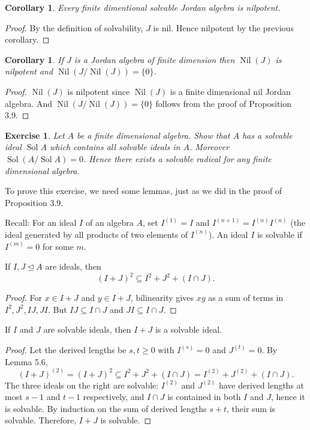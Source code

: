 \documentclass{article}
\newtheorem{corollary}[theorem]{Corollary}
\newtheorem{exercise}[theorem]{Exercise}
\begin{document}
\begin{corollary}
Every finite dimentional solvable Jordan algebra is nilpotent.
\end{corollary}

\begin{proof} 
By the definition of solvability, $ J $ is nil. Hence nilpotent by the previous corollary.
\end{proof}

\begin{corollary}  
If $J$ is a Jordan algebra of finite dimension then $\operatorname{Nil}(J)$ is nilpotent and $\operatorname{Nil}(J/\operatorname{Nil}(J)) = \{0\}$.  
\end{corollary}  

\begin{proof} 
$ \operatorname{Nil}(J) $ is nilpotent since $ \operatorname{Nil}(J) $ is a finite dimensional nil Jordan algebra. And $\operatorname{Nil}(J/\operatorname{Nil}(J)) = \{0\}$ follows from the proof of Proposition 3.9. 
\end{proof}

\begin{exercise}  
Let $A$ be a finite dimensional algebra. Show that $A$ has a solvable ideal $\operatorname{Sol} A$ which contains all solvable ideals in $ A $. Moreover $ \operatorname{Sol}(A/\operatorname{Sol} A)=0 $. Hence there exists a solvable radical for any finite dimensional algebra.  
\end{exercise} 

To prove this exercise, we need some lemmas, just as we did in the proof of Proposition 3.9.

Recall: For an ideal $I$ of an algebra $A$, set $I^{(1)} = I$ and $I^{(n+1)} = I^{(n)} I^{(n)}$ (the ideal generated by all products of two elements of $I^{(n)}$). An ideal $I$ is solvable if $I^{(m)} = 0$ for some $m$.  

\begin{lemma}  
If $I, J \trianglelefteq A$ are ideals, then  
\[ (I+J)^2 \subseteq I^2 + J^2 + (I \cap J). \]  
\end{lemma}  
\begin{proof}  
For $x \in I+J$ and $y \in I+J$, bilinearity gives $xy$ as a sum of terms in $I^2, J^2, IJ, JI$. But $IJ \subseteq I \cap J$ and $JI \subseteq I \cap J$.
\end{proof} 

\begin{lemma}  
If $I$ and $J$ are solvable ideals, then $I+J$ is a solvable ideal.  
\end{lemma}  
\begin{proof}  
Let the derived lengths be $s, t \ge 0$ with $I^{(s)} = 0$ and $J^{(t)} = 0$. By Lemma 5.6,  
\[ (I+J)^{(2)} = (I+J)^2 \subseteq I^2 + J^2 + (I \cap J) = I^{(2)} + J^{(2)} + (I \cap J). \]  
The three ideals on the right are solvable: $I^{(2)}$ and $J^{(2)}$ have derived lengths at most $s-1$ and $t-1$ respectively, and $I \cap J$ is contained in both $I$ and $J$, hence it is solvable. By induction on the sum of derived lengths $s+t$, their sum is solvable. Therefore, $I+J$ is solvable.  
\end{proof}  
\end{document}

